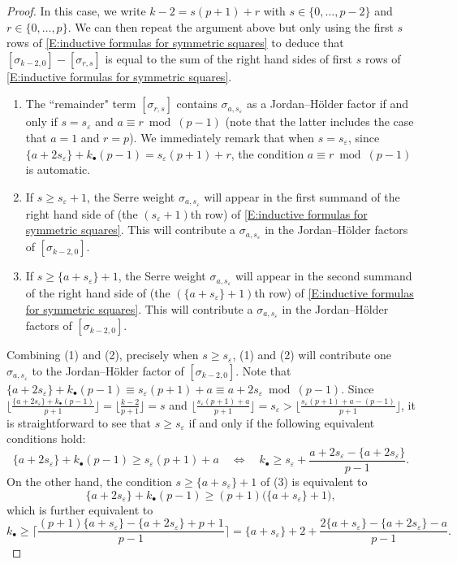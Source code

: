 \documentclass[12pt]{amsart}
\theoremstyle{definition}
\numberwithin{equation}{subsection}
\begin{document}
\begin{proof}
In this case, we write $k-2=s(p+1)+r$ with $s\in \{0, \dots, p-2\}$ and $r \in \{0, \dots, p\}$. We can then repeat the argument above but only using the first $s$ rows of \eqref{E:inductive formulas for symmetric squares} to deduce that $[\sigma_{k-2,0}] - [\sigma_{r,s}]$ is equal to the sum of the right hand sides of first $s$ rows of \eqref{E:inductive formulas for symmetric squares}.
\begin{enumerate}
\item 
The ``remainder" term $[\sigma_{r,s}]$ contains $\sigma_{a,s_\varepsilon}$ as a Jordan--H\"older factor  if and only if $s=s_\varepsilon$ and $a  \equiv r \bmod{(p-1)}$ (note that the latter includes the case that $a=1$ and $r=p$).  We immediately remark that when $s=s_\varepsilon$, since $\{a+2s_\varepsilon\} + k_\bullet(p-1) = s_\varepsilon (p+1) +r$, the condition $a \equiv r \bmod{(p-1)}$ is automatic.

\item 
If $s\geq s_\varepsilon +1$, the Serre weight $\sigma_{a, s_\varepsilon}$ will appear in the first summand of the right hand side of (the $(s_\varepsilon + 1)$th row) of \eqref{E:inductive formulas for symmetric squares}. This will contribute a $\sigma_{a, s_\varepsilon}$ in the Jordan--H\"older factors of $[\sigma_{k-2,0}]$.

\item 
If $s \geq \{a+s_{\varepsilon}\} + 1$, 
 the Serre weight $\sigma_{a, s_\varepsilon}$ will appear in the second summand of the right hand side of (the $(\{a+s_{\varepsilon}\} + 1)$th row) of \eqref{E:inductive formulas for symmetric squares}. This will contribute a $\sigma_{a, s_{\varepsilon}}$ in the Jordan--H\"older factors of $[\sigma_{k-2,0}]$.
\end{enumerate}
Combining (1) and (2), precisely when $s \geq s_\varepsilon$, (1) and (2) will contribute one $\sigma_{a, s_\varepsilon}$ to the Jordan--H\"older factor of $[\sigma_{k-2,0}]$. Note that $\{a+2s_\varepsilon \}+k_\bullet(p-1)\equiv s_\varepsilon(p+1)+a\equiv a+2s_\varepsilon \bmod (p-1)$. Since $\lfloor \frac{\{a+2s_\varepsilon\} + k_\bullet(p-1)}{p+1} \rfloor=\lfloor \frac{k-2}{p+1}\rfloor=s$ and $\lfloor\frac{s_\varepsilon(p+1)+a}{p+1}\rfloor=s_\varepsilon>\lfloor\frac{s_\varepsilon(p+1)+a-(p-1)}{p+1}\rfloor$, it is straightforward to see that $s \geq s_\varepsilon$ if and only if the following equivalent conditions hold:
\begin{equation}
\label{E:t1}
\{a+2s_\varepsilon\} + k_\bullet(p-1) \geq s_\varepsilon(p+1)  + a \quad  \Longleftrightarrow \quad k_\bullet \geq s_\varepsilon + \frac{a+2s_\varepsilon - \{a+2s_\varepsilon\}}{p-1}.
\end{equation}
On the other hand, the condition $s \geq \{a+s_\varepsilon\}+1$ of (3) is equivalent to
$$
\{a+2s_\varepsilon\} + k_\bullet(p-1) \geq (p+1) \big( \{a+s_\varepsilon\}+1\big),
$$
which is further equivalent to
\begin{equation}
\label{E:t2}
k_\bullet \geq \Big\lceil \frac{(p+1)\{a+s_\varepsilon\}-\{a+2s_\varepsilon\}+p+1}{p-1}\Big\rceil = \{a+s_\varepsilon\} + 2 + \frac{2\{a+s_\varepsilon\} - \{a+2s_\varepsilon\} - a}{p-1}.
\end{equation}


\end{proof}
\end{document}
